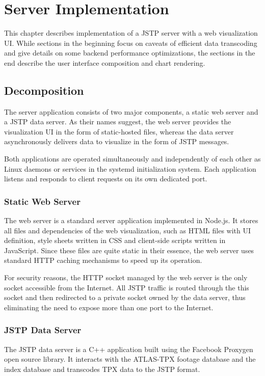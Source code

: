 \chapter{Server Implementation}
This chapter describes implementation of a JSTP server with a web visualization UI. While sections in the beginning focus on caveats of efficient data transcoding and give details on some backend performance optimizations, the sections in the end describe the user interface composition and chart rendering.

\section{Decomposition}
The server application consists of two major components, a static web server and a JSTP data server. As their names suggest, the web server provides the visualization UI in the form of static-hosted files, whereas the data server asynchronously delivers data to visualize in the form of JSTP messages.

Both applications are operated simultaneously and independently of each other as Linux daemons or services in the systemd initialization system. Each application listens and responds to client requests on its own dedicated port.

\subsection{Static Web Server}
The web server is a standard server application implemented in Node.js. It stores all files and dependencies of the web visualization, such as HTML files with UI definition, style sheets written in CSS and client-side scripts written in JavaScript. Since these files are quite static in their essence, the web server uses standard HTTP caching mechanisms to speed up its operation.

For security reasons, the HTTP socket managed by the web server is the only socket accessible from the Internet. All JSTP traffic is routed through the this socket and then redirected to a private socket owned by the data server, thus eliminating the need to expose more than one port to the Internet.

\subsection{JSTP Data Server}
The JSTP data server is a C++ application built using the Facebook Proxygen open source library. It interacts with the ATLAS-TPX footage database and the index database and transcodes TPX data to the JSTP format.

